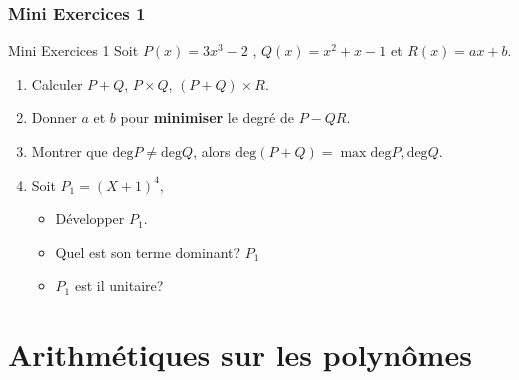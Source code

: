 \documentclass{beamer}
\begin{document}
\begin{frame}[t]
  \frametitle{Mini Exercices 1}
 \begin{block}{Mini Exercices 1}
  Soit $P(x) =3x^3 - 2$ , $Q(x) = x^2+x-1$ et $R(x) = ax+b$.\\[8pt]
   \begin{enumerate}
     \small
     \item Calculer $P +  Q$, $P\times Q$, $(P+Q)\times R$.\\[6pt]
     \item Donner $a$ et $b$ pour \textbf{\alert{minimiser}} le degré de
       $P-QR$.\\[6pt]
      \item Montrer que $\text{deg}P\neq \text{deg}Q$, alors
        $\text{deg}(P+Q)=\max{\text{deg}P, \text{deg}Q}$. \\[6pt]

      \item Soit $P_1=(X+1)^4$,
        \begin{itemize}
          \item Développer $P_1$.
          \item Quel est son terme dominant? $P_1$ 
          \item $P_1$ est il unitaire?
        \end{itemize}

   \end{enumerate}
 \end{block} 
\end{frame}


\section{Arithmétiques sur les polynômes}%
\label{sec:arithmétiques_sur_les_polynômes}
\end{document}
